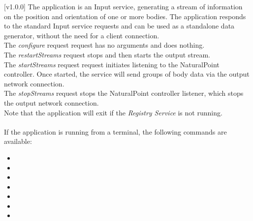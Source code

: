 [v1.0.0]
The  application is an Input service,
generating a stream of information on the position and orientation of one or more bodies.
The application responds to the standard Input service requests and can be used as a
standalone data generator, without the need for a client connection.\\

The \emph{configure} request request has no arguments and does nothing.\\

The \emph{restartStreams} request stops and then starts the output stream.\\

The \emph{startStreams} request request initiates listening to the NaturalPoint
controller.
Once started, the service will send groups of body data via the output \yarp{} network
connection.\\

The \emph{stopStreams} request stops the NaturalPoint controller listener, which stops the
output \yarp{} network connection.\\ 

Note that the application will exit if the \emph{Registry Service} is not running.\\

\insertAppParameters{}
\insertTagDescription{\NPI}
\insertInputServiceComment{}\\

If the application is running from a terminal, the following commands are available:
\begin{itemize}
\item{}
\item\exSp{}
\item\exSp{}
\item\exSp{}
\item\exSp{}
\item\exSp{}
\item\exSp{}
\end{itemize}
\primaryEnd{}
